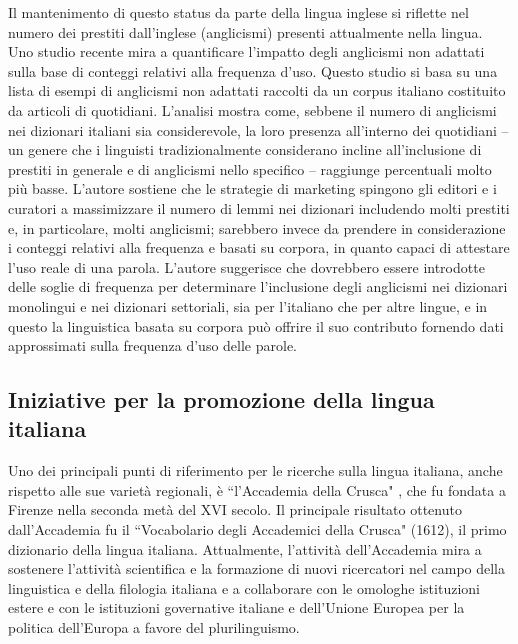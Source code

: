 \begin{multicols}{2}
Il mantenimento di questo status da parte della lingua inglese si riflette nel
numero dei prestiti dall'inglese (anglicismi) presenti attualmente nella
lingua. Uno studio recente \cite{Fischer} mira a quantificare l'impatto degli
anglicismi non adattati sulla base di conteggi relativi alla frequenza d'uso. 
Questo studio si basa su una lista di esempi di anglicismi non adattati
raccolti da un corpus italiano costituito da articoli di quotidiani. L'analisi
mostra come, sebbene il numero di anglicismi nei dizionari italiani sia
considerevole, la loro presenza all'interno dei quotidiani -- un genere che i
linguisti tradizionalmente considerano incline all'inclusione di prestiti in
generale e di anglicismi nello specifico -- raggiunge percentuali molto pi\`{u}
basse. L'autore sostiene che le strategie di marketing spingono gli editori e
i curatori a massimizzare il numero di lemmi nei dizionari includendo molti
prestiti e, in particolare, molti anglicismi; sarebbero invece da prendere in
considerazione i conteggi relativi alla frequenza e basati su corpora, in
quanto capaci di attestare l'uso reale di una parola. L'autore suggerisce che
dovrebbero essere introdotte delle soglie di frequenza per determinare
l'inclusione degli anglicismi nei dizionari monolingui e nei dizionari
settoriali, sia per l'italiano che per altre lingue, e in questo la
linguistica basata su corpora pu\`{o} offrire il suo contributo fornendo dati
approssimati sulla frequenza d'uso delle parole.


\subsection{Iniziative per la promozione della lingua italiana}

Uno dei principali punti di riferimento per le ricerche sulla lingua italiana,
anche rispetto alle sue variet\`{a} regionali, \`{e} ``l'Accademia della
Crusca" \cite{Crusca}, che fu fondata a Firenze nella seconda met\`{a} del XVI
secolo. Il principale risultato ottenuto dall'Accademia fu il ``Vocabolario
degli Accademici della Crusca" (1612), il primo dizionario della lingua
italiana. Attualmente, l'attivit\`{a} dell'Accademia mira a sostenere
l'attivit\`{a} scientifica e la formazione di nuovi ricercatori nel campo
della linguistica e della filologia italiana e a collaborare con le omologhe
istituzioni estere e con le istituzioni governative italiane e dell'Unione
Europea per la politica dell'Europa a favore del plurilinguismo. 



\end{multicols}
